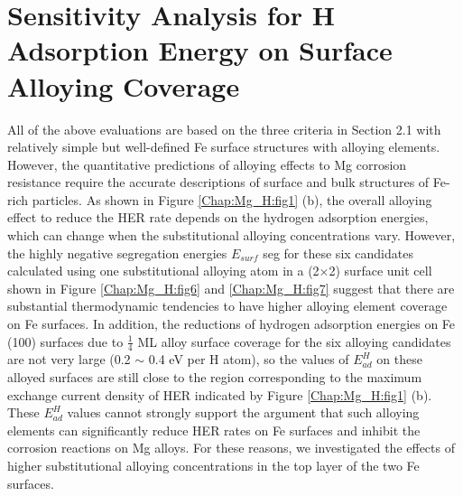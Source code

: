 \section{Sensitivity Analysis for H Adsorption Energy on Surface Alloying Coverage}

All of the above evaluations are based on the three criteria in Section 2.1 with relatively simple but well-defined Fe surface structures with alloying elements. However, the quantitative predictions of alloying effects to Mg corrosion resistance require the accurate descriptions of surface and bulk structures of Fe-rich particles. As shown in Figure \ref{Chap:Mg_H:fig1} (b), the overall alloying effect to reduce the \ac{HER} rate depends on the hydrogen adsorption energies, which can change when the substitutional alloying concentrations vary. However, the highly negative segregation energies $E_{surf}$ seg for these six candidates calculated using one substitutional alloying atom in a (2$\times$2) surface unit cell shown in Figure \ref{Chap:Mg_H:fig6} and \ref{Chap:Mg_H:fig7} suggest that there are substantial thermodynamic tendencies to have higher alloying element coverage on Fe surfaces. In addition, the reductions of hydrogen adsorption energies on Fe (100) surfaces due to $\frac{1}{4}$ \ac{ML} alloy surface coverage for the six alloying candidates are not very large (0.2 $\sim$ 0.4 eV per H atom), so the values of $E_{ad}^H$  on these alloyed surfaces are still close to the region corresponding to the maximum exchange current density of HER indicated by Figure \ref{Chap:Mg_H:fig1} (b). These $E_{ad}^H$ values cannot strongly support the argument that such alloying elements can significantly reduce HER rates on Fe surfaces and inhibit the corrosion reactions on Mg alloys. For these reasons, we investigated the effects of higher substitutional alloying concentrations in the top layer of the two Fe surfaces.


